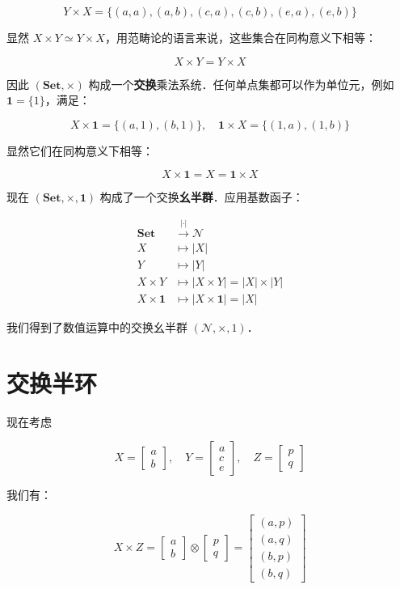 \documentclass[10pt, openany]{book}
\begin{document}
\[
Y \times X = \{ (a,a),(a,b),(c,a),(c,b),(e,a),(e,b) \}
\]

显然 $X \times Y \simeq Y \times X$，用范畴论的语言来说，这些集合在同构意义下相等：

\[
X \times Y = Y \times X
\]

因此 $(\textbf{Set},\times)$ 构成一个\textbf{交换}乘法系统．任何单点集都可以作为单位元，例如 $\mathbf{1} = \{1\}$，满足：

\[
X \times \mathbf{1} = \{ (a,1),(b,1) \},\quad \mathbf{1} \times X = \{ (1,a),(1,b) \}
\]

显然它们在同构意义下相等：

\[
X \times \mathbf{1} = X = \mathbf{1} \times X
\]

现在 $(\textbf{Set},\times,\mathbf{1})$ 构成了一个交换\textbf{幺半群}．应用基数函子：

\[
\begin{aligned}
\textbf{Set} &\stackrel{|\cdot|}{\longrightarrow} \mathcal N \\
X &\mapsto |X| \\
Y &\mapsto |Y| \\
X \times Y &\mapsto |X \times Y| = |X| \times |Y| \\
X \times \mathbf{1} &\mapsto |X \times \mathbf{1}| = |X|
\end{aligned}
\]

我们得到了数值运算中的交换幺半群 $(\mathcal N,\times,1)$．

\section{交换半环}

现在考虑

\[
X = \begin{bmatrix}a\\b\end{bmatrix},\quad 
Y = \begin{bmatrix}a\\c\\e\end{bmatrix},\quad 
Z = \begin{bmatrix}p\\q\end{bmatrix}
\]

我们有：

\[
X \times Z = \begin{bmatrix}a\\b\end{bmatrix} \otimes \begin{bmatrix}p\\q\end{bmatrix}
= \begin{bmatrix}(a,p)\\(a,q)\\(b,p)\\(b,q)\end{bmatrix}
\]
\end{document}
